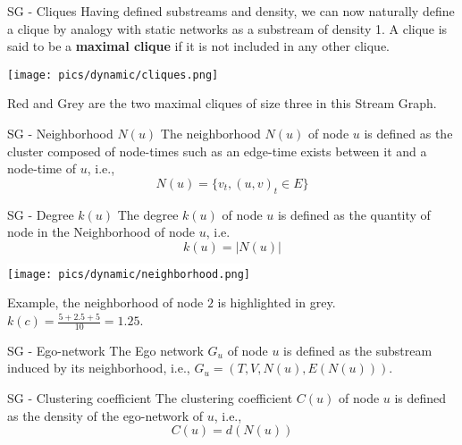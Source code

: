\begin{textbox}{SG - Cliques}
    Having defined substreams and density, we can now naturally define a clique by analogy with static networks as a substream of density 1. A clique is said to be a \textbf{maximal clique} if it is not included in any other clique.

    \centering

    \vspace{0.3cm}

    \texttt{[image: pics/dynamic/cliques.png]}

    Red and Grey are the two maximal cliques of size three in this Stream Graph.

\end{textbox}

\begin{textbox}{SG - Neighborhood $N(u)$}
    The neighborhood $N(u)$ of node $u$ is defined as the cluster composed of node-times such as an edge-time exists between it and a node-time of $u$, i.e.,
    \[
        N(u)= \{v_t,(u,v)_t \in E\}
    \]
\end{textbox}


\begin{textbox}{SG - Degree $k(u)$}
    The degree $k(u)$ of node $u$ is defined as the quantity of node in the Neighborhood of node $u$, i.e.
    \[
        k(u)=|N(u)|
    \]

    \centering
    \colorbox{white}{\texttt{[image: pics/dynamic/neighborhood.png]}}

    Example, the neighborhood of node $2$ is highlighted in grey. \\$k(c)=\frac{5+2.5+5}{10}=1.25$.
\end{textbox}


\begin{textbox}{SG - Ego-network}
    The Ego network $G_u$ of node $u$ is defined as the substream induced by its neighborhood, i.e., $G_u=(T,V,N(u),E(N(u)))$.
\end{textbox}


\begin{textbox}{SG - Clustering coefficient}
    The clustering coefficient $C(u)$ of node $u$ is defined as the density of the ego-network of $u$, i.e.,
    \[
        C(u)=d(N(u))
    \]

\end{textbox}

